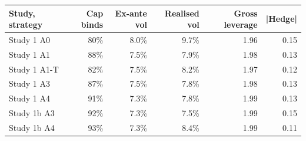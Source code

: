 \begin{tabular}{lrrrrr}
\toprule
Study, strategy & Cap binds & Ex-ante vol & Realised vol & Gross leverage & |Hedge| \\
\midrule
Study 1 A0 & 80\% & 8.0\% & 9.7\% & 1.96 & 0.15 \\
Study 1 A1 & 88\% & 7.5\% & 7.9\% & 1.98 & 0.13 \\
Study 1 A1-T & 82\% & 7.5\% & 8.2\% & 1.97 & 0.12 \\
Study 1 A3 & 87\% & 7.5\% & 7.8\% & 1.98 & 0.13 \\
Study 1 A4 & 91\% & 7.3\% & 7.8\% & 1.99 & 0.13 \\
Study 1b A3 & 92\% & 7.3\% & 7.5\% & 1.99 & 0.15 \\
Study 1b A4 & 93\% & 7.3\% & 8.4\% & 1.99 & 0.11 \\
\bottomrule
\end{tabular}
